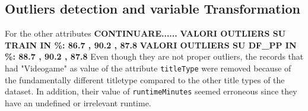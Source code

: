 \subsection{Outliers detection and variable Transformation}
For the other attributes \textbf{CONTINUARE......}
\textbf{VALORI OUTLIERS SU TRAIN IN \%: 86.7 , 90.2 , 87.8}
\textbf{VALORI OUTLIERS SU DF\_PP IN \%: 88.7 , 90.2 , 87.8}
Even though they are not proper outliers, the records that had "Videogame" as value of the attribute \texttt{titleType} were removed 
because of the fundamentally different titletype compared to the other title types of the dataset. In addition, their value of \texttt{runtimeMinutes}
seemed erroneous since they have an undefined or irrelevant runtime.


